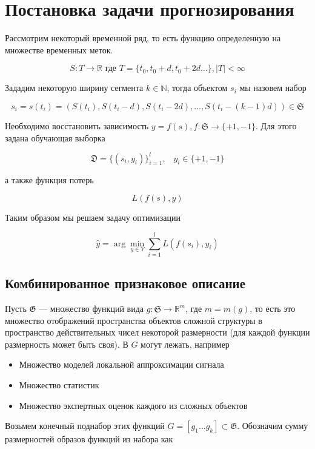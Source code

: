 \documentclass[12pt,fleqn,unicode]{article}
\newcommand{\R}{\mathbb{R}}
\newcommand{\N}{\mathbb{N}}
\begin{document}
\newpage
\section{Постановка задачи прогнозирования}

Рассмотрим некоторый временной ряд, то есть функцию определенную на множестве
временных меток.

$$
S: T \to \R \text{ где } T = \{t_0, t_0 + d, t_0 + 2d \ldots\}, |T| < \infty
$$

Зададим некоторую ширину сегмента $k \in \N$, тогда объектом $s_i$ мы
назовем набор

$$
s_i = s(t_i) = (S(t_i), S(t_i - d), S(t_i - 2d), \ldots, S(t_i - (k - 1)d)) \in \mathfrak{S}
$$

Необходимо восстановить зависимость $y = f(s), f: \mathfrak{S} \to \{+1, -1\}$.
Для этого задана обучающая выборка

$$
\mathfrak{D} = \{ (s_i, y_i) \}_{i=1}^l, \;\;\; y_i \in \{+1, -1\}
$$

а также функция потерь

$$
L(f(s), y)
$$

Таким образом мы решаем задачу оптимизации

$$
\hat{y} = \arg\min_{y \in Y} \sum_{i = 1}^l L(f(s_i), y_i)
$$

\subsection{Комбинированное признаковое описание}

Пусть $\mathfrak{G}$ --- множество функций вида
$g: \mathfrak{S} \to \R^m$, где $m = m(g)$, то есть это множество отображений
пространства объектов сложной структуры в пространство действительных чисел
некоторой размерности (для каждой функции размерность может быть своя). В
$G$ могут лежать, например

\begin{itemize}
    \item Множество моделей локальной аппроксимации сигнала
    \item Множество статистик
    \item Множество экспертных оценок каждого из сложных объектов
\end{itemize}

Возьмем конечный поднабор этих функций $G = [g_1\ldots g_k] \subset \mathfrak{G}$.
Обозначим сумму размерностей образов функций из набора как
\end{document}
